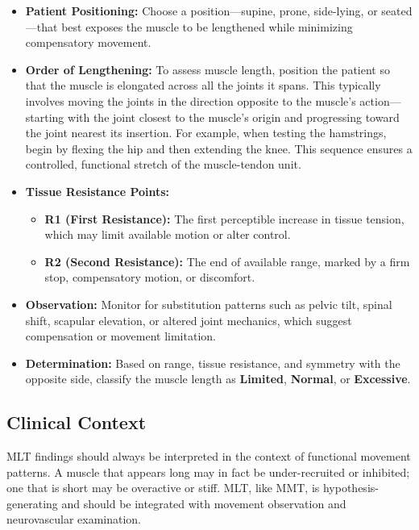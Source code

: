 \begin{itemize}
  \item \textbf{Patient Positioning:} Choose a position—supine, prone, side-lying, or seated—that best exposes the muscle to be lengthened while minimizing compensatory movement.

  \item \textbf{Order of Lengthening:} To assess muscle length, position the patient so that the muscle is elongated across all the joints it spans. This typically involves moving the joints in the direction opposite to the muscle’s action—starting with the joint closest to the muscle’s origin and progressing toward the joint nearest its insertion. For example, when testing the hamstrings, begin by flexing the hip and then extending the knee. This sequence ensures a controlled, functional stretch of the muscle-tendon unit.

  \item \textbf{Tissue Resistance Points:}
    \begin{itemize}
      \item \textbf{R1 (First Resistance):} The first perceptible increase in tissue tension, which may limit available motion or alter control.
      \item \textbf{R2 (Second Resistance):} The end of available range, marked by a firm stop, compensatory motion, or discomfort.
    \end{itemize}

  \item \textbf{Observation:} Monitor for substitution patterns such as pelvic tilt, spinal shift, scapular elevation, or altered joint mechanics, which suggest compensation or movement limitation.

  \item \textbf{Determination:} Based on range, tissue resistance, and symmetry with the opposite side, classify the muscle length as \textbf{Limited}, \textbf{Normal}, or \textbf{Excessive}.
\end{itemize}

\subsection*{Clinical Context}
MLT findings should always be interpreted in the context of functional movement patterns. A muscle that appears long may in fact be under-recruited or inhibited; one that is short may be overactive or stiff. MLT, like MMT, is hypothesis-generating and should be integrated with movement observation and neurovascular examination.

